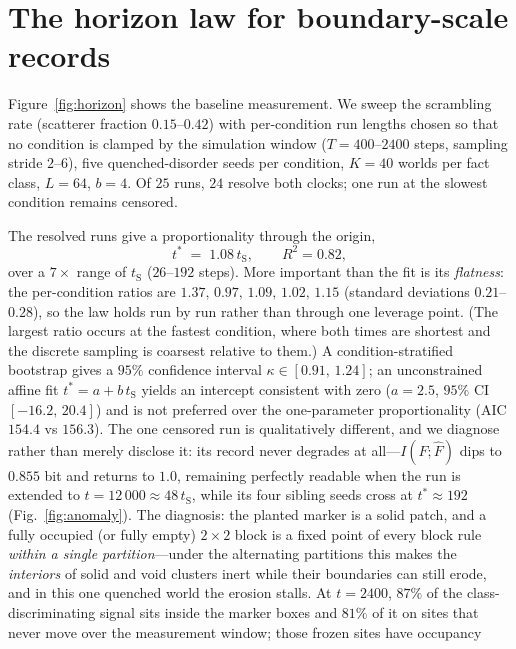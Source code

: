 \documentclass[aps,pre,twocolumn,superscriptaddress,nofootinbib,longbibliography]{revtex4-2}
\newcommand{\tS}{t_{\mathrm{S}}}
\newcommand{\tstar}{t^{*}}
\newcommand{\kap}{\kappa}
\begin{document}
\section{The horizon law for boundary-scale records}
\label{sec:horizon}

Figure~\ref{fig:horizon} shows the baseline measurement. We sweep the scrambling rate
(scatterer fraction $0.15$--$0.42$) with per-condition run lengths chosen so that no
condition is clamped by the simulation window ($T=400$--$2400$ steps, sampling stride
$2$--$6$), five quenched-disorder seeds per condition, $K=40$ worlds per fact class,
$L=64$, $b=4$. Of $25$ runs, $24$ resolve both clocks; one run at the slowest condition
remains censored.

The resolved runs give a proportionality through the origin,
\begin{equation}
\tstar \;=\; 1.08\,\tS, \qquad R^2=0.82,
\end{equation}
over a $7\times$ range of $\tS$ ($26$--$192$ steps). More important than the fit is its
\emph{flatness}: the per-condition ratios are $1.37,\,0.97,\,1.09,\,1.02,\,1.15$ (standard
deviations $0.21$--$0.28$), so the law holds run by run rather than through one leverage
point. (The largest ratio occurs at the fastest condition, where both times are shortest
and the discrete sampling is coarsest relative to them.) A condition-stratified bootstrap
gives a $95\%$ confidence interval $\kap\in[0.91,\,1.24]$; an unconstrained affine fit
$\tstar=a+b\,\tS$ yields an intercept consistent with zero ($a=2.5$, $95\%$ CI
$[-16.2,\,20.4]$) and is not preferred over the one-parameter proportionality (AIC $154.4$
vs $156.3$). The one censored run is qualitatively different, and we diagnose rather than
merely disclose it: its record never degrades at all---$I(F;\hat F)$ dips to $0.855$ bit
and returns to $1.0$, remaining perfectly readable when the run is extended to
$t=12\,000\approx48\,\tS$, while its four sibling seeds cross at $\tstar\approx192$
(Fig.~\ref{fig:anomaly}). The diagnosis: the planted marker is a solid patch, and a fully
occupied (or fully empty) $2\times2$ block is a fixed point of every block rule
\emph{within a single partition}---under the alternating partitions this makes the
\emph{interiors} of solid and void clusters inert while their boundaries can still erode,
and in this one quenched world the erosion stalls. At $t=2400$,
$87\%$ of the class-discriminating signal sits inside the marker boxes and $81\%$ of it on
sites that never move over the measurement window; those frozen sites have occupancy
\end{document}
